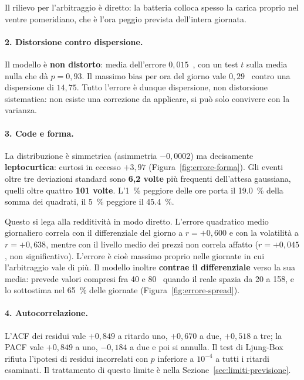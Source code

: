Il rilievo per l'arbitraggio \`e diretto: la batteria colloca spesso la carica proprio nel
ventre pomeridiano, che \`e l'ora peggio prevista dell'intera giornata.

\paragraph{2. Distorsione contro dispersione.} Il modello \`e \textbf{non distorto}: media
dell'errore $0{,}015$~\euromwh{}, con un test $t$ sulla media nulla che d\`a $p = 0{,}93$. Il
massimo bias per ora del giorno vale $0{,}29$~\euromwh{} contro una dispersione di
$14{,}75$. Tutto l'errore \`e dunque dispersione, non distorsione sistematica: non esiste una
correzione da applicare, si pu\`o solo convivere con la varianza.

\paragraph{3. Code e forma.} La distribuzione \`e simmetrica (asimmetria $-0{,}0002$) ma
decisamente \textbf{leptocurtica}: curtosi in eccesso $+3{,}97$
(Figura~\ref{fig:errore-forma}). Gli eventi oltre tre deviazioni standard sono \textbf{6,2
volte} pi\`u frequenti dell'attesa gaussiana, quelli oltre quattro \textbf{101 volte}.
L'\SI{1}{\percent} peggiore delle ore porta il \SI{19,0}{\percent} della somma dei quadrati,
il \SI{5}{\percent} peggiore il \SI{45,4}{\percent}.

Questo si lega alla redditivit\`a in modo diretto. L'errore quadratico medio giornaliero
correla con il differenziale del giorno a $r = +0{,}600$ e con la volatilit\`a a $r =
+0{,}638$, mentre con il livello medio dei prezzi non correla affatto ($r = +0{,}045$, non
significativo). L'errore \`e cio\`e massimo proprio nelle giornate in cui l'arbitraggio vale
di pi\`u. Il modello inoltre \textbf{contrae il differenziale} verso la sua media: prevede
valori compresi fra 40 e 80~\euromwh{} quando il reale spazia da 20 a
158, e lo sottostima nel \SI{65}{\percent} delle giornate
(Figura~\ref{fig:errore-spread}).

\paragraph{4. Autocorrelazione.} L'\ac{ACF} dei residui vale $+0{,}849$ a ritardo uno,
$+0{,}670$ a due, $+0{,}518$ a tre; la \ac{PACF} vale $+0{,}849$ a uno, $-0{,}184$ a due e
poi si annulla. Il test di Ljung-Box rifiuta l'ipotesi di residui incorrelati con $p$
inferiore a $10^{-4}$ a tutti i ritardi esaminati. Il trattamento di questo limite \`e nella
Sezione~\ref{sec:limiti-previsione}.

